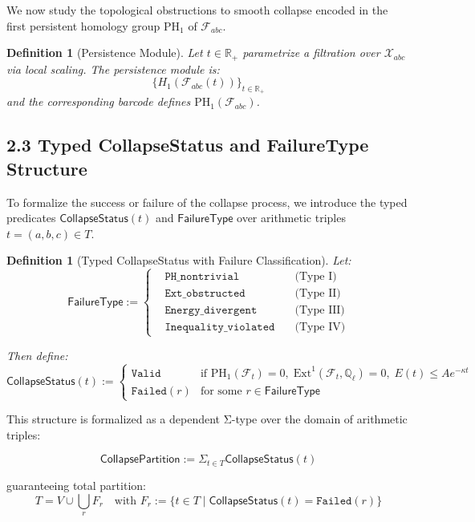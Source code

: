 \documentclass[11pt]{article}
\newtheorem{definition}[theorem]{Definition}
\begin{document}
We now study the topological obstructions to smooth collapse encoded in the first persistent homology group $\mathrm{PH}_1$ of $\mathcal{F}_{abc}$.

\begin{definition}[Persistence Module]
Let $t \in \mathbb{R}_+$ parametrize a filtration over $\mathcal{X}_{abc}$ via local scaling. The persistence module is:
\[
\{ H_1(\mathcal{F}_{abc}(t)) \}_{t \in \mathbb{R}_+}
\]
and the corresponding barcode defines $\mathrm{PH}_1(\mathcal{F}_{abc})$.
\end{definition}

\subsection{2.3 Typed CollapseStatus and FailureType Structure}

To formalize the success or failure of the collapse process, we introduce the typed predicates \( \mathsf{CollapseStatus}(t) \) and \( \mathsf{FailureType} \) over arithmetic triples \( t = (a,b,c) \in T \).

\begin{definition}[Typed CollapseStatus with Failure Classification]
Let:
\[
\mathsf{FailureType} := \left\{
\begin{aligned}
& \texttt{PH\_nontrivial} \quad & \text{(Type I)} \\
& \texttt{Ext\_obstructed} \quad & \text{(Type II)} \\
& \texttt{Energy\_divergent} \quad & \text{(Type III)} \\
& \texttt{Inequality\_violated} \quad & \text{(Type IV)}
\end{aligned}
\right.
\]

Then define:
\[
\mathsf{CollapseStatus}(t) :=
\begin{cases}
\texttt{Valid} & \text{if } \mathrm{PH}_1(\mathcal{F}_t) = 0,\; \mathrm{Ext}^1(\mathcal{F}_t, \mathbb{Q}_\ell) = 0,\; E(t) \leq A e^{-\kappa t} \\
\texttt{Failed}(r) & \text{for some } r \in \mathsf{FailureType}
\end{cases}
\]
\end{definition}

This structure is formalized as a dependent Σ-type over the domain of arithmetic triples:

\[
\mathsf{CollapsePartition} := \Sigma_{t \in T} \mathsf{CollapseStatus}(t)
\]

guaranteeing total partition:
\[
T = V \cup \bigcup_r F_r
\quad \text{with } F_r := \{ t \in T \mid \mathsf{CollapseStatus}(t) = \texttt{Failed}(r) \}
\]
\end{document}
